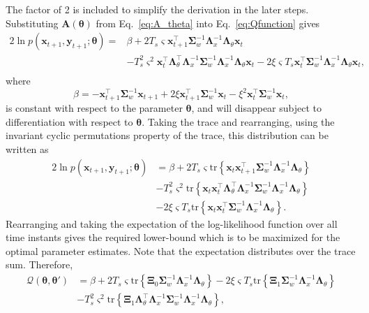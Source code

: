 \documentclass[review,authoryear,3p]{elsarticle}
\begin{document}
The factor of 2 is included to simplify the derivation in the later steps. Substituting $\mathbf A( \boldsymbol\theta)$ from Eq.~\eqref{eq:A_theta} into Eq.~\eqref{eq:Qfunction} gives
\begin{align}
2\ln p(\mathbf x_{t+1}, \mathbf y_{t+1};\boldsymbol\theta)=&\beta+2 T_s\varsigma\mathbf x_{t+1}^\top\boldsymbol\Sigma_w^{-1}\boldsymbol\Lambda_x^{-1}\boldsymbol\Lambda_{\theta}\mathbf x_t \nonumber \\
&-T_s^2\varsigma^2\mathbf x_t^\top \boldsymbol\Lambda_{\theta}^\top\boldsymbol\Lambda_x^{-1}\boldsymbol\Sigma_w^{-1}\boldsymbol\Lambda_x^{-1}\boldsymbol\Lambda_{\theta}\mathbf x_t-2\xi \varsigma T_s\mathbf x_t^\top\boldsymbol\Sigma_w^{-1}\boldsymbol\Lambda_x^{-1}\boldsymbol\Lambda_{\theta}\mathbf x_t,\nonumber \\
\end{align}
where 
\begin{equation}
\beta=-\mathbf x_{t+1}^\top\boldsymbol\Sigma_w^{-1}\mathbf x_{t+1}+2\xi\mathbf x_{t+1}^\top\boldsymbol\Sigma_w^{-1}\mathbf x_t-\xi^2\mathbf x_t^\top\boldsymbol\Sigma_w^{-1}\mathbf x_t,
\end{equation}
is constant with respect to the parameter $\boldsymbol\theta$, and will disappear subject to differentiation with respect to $\boldsymbol\theta$. Taking the trace and rearranging, using the invariant cyclic permutations property of the trace, this distribution can be written as
\begin{align}\label{eq:Qfunctionintrace}
2\ln p(\mathbf x_{t+1}, \mathbf y_{t+1};\boldsymbol\theta)&=\beta+2 T_s\varsigma\mathrm{tr} \left\lbrace \mathbf x_t\mathbf x_{t+1}^\top\boldsymbol\Sigma_w^{-1}\boldsymbol\Lambda_x^{-1}\boldsymbol\Lambda_{\theta}\right\rbrace \nonumber \\
&-T_s^2\varsigma^2\mathrm{tr} \left\lbrace \mathbf x_t\mathbf x_t^\top \boldsymbol\Lambda_{\theta}^\top\boldsymbol\Lambda_x^{-1}\boldsymbol\Sigma_w^{-1}\boldsymbol\Lambda_x^{-1}\boldsymbol\Lambda_{\theta}\right\rbrace\nonumber \\
&-2\xi\varsigma T_s\mathrm{tr} \left\lbrace \mathbf x_t\mathbf x_{t}^\top\boldsymbol\Sigma_w^{-1}\boldsymbol\Lambda_x^{-1}\boldsymbol\Lambda_{\theta}\right\rbrace.
\end{align}
Rearranging and taking the expectation of the log-likelihood function over all time instants gives the required lower-bound which is to be maximized for the optimal parameter estimates. Note that the expectation distributes over the trace sum. Therefore, 
\begin{align}\label{eq:MRA-QintermsofTraces}
\mathcal Q(\boldsymbol \theta, \boldsymbol\theta')&=\beta+2 T_s\varsigma\mathrm{tr} \left\lbrace \boldsymbol \Xi_0\boldsymbol\Sigma_w^{-1}\boldsymbol\Lambda_x^{-1}\boldsymbol\Lambda_{\theta}\right\rbrace-2\xi\varsigma T_s\mathrm{tr} \left\lbrace \boldsymbol\Xi_1\boldsymbol\Sigma_w^{-1}\boldsymbol\Lambda_x^{-1}\boldsymbol\Lambda_{\theta}\right\rbrace \nonumber \\
&-T_s^2\varsigma^2\mathrm{tr} \left\lbrace \boldsymbol\Xi_1 \boldsymbol\Lambda_{\theta}^\top\boldsymbol\Lambda_x^{-1}\boldsymbol\Sigma_w^{-1}\boldsymbol\Lambda_x^{-1}\boldsymbol\Lambda_{\theta}\right\rbrace,
\end{align}
\end{document}
